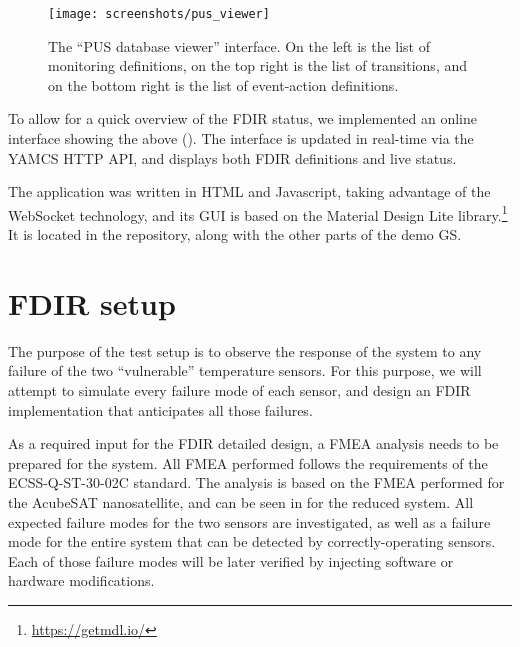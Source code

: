 \documentclass[a4paper,nobib]{tufte-book}
\begin{document}
\begin{figure}[h]
	\texttt{[image: screenshots/pus\_viewer]}
	\caption[The ``PUS database viewer'' interface]{The ``\acs{PUS} database viewer'' interface. On the left is the list of monitoring definitions, on the top right is the list of transitions, and on the bottom right is the list of event-action definitions.}
		\label{fig:pusviewer}
\end{figure}
	
To allow for a quick overview of the \acs{FDIR} status, we implemented an online interface showing the above (). The interface is updated in real-time via the \acs{YAMCS} \acs{HTTP} \acs{API}, and displays both \acs{FDIR} definitions and live status.

The application was written in HTML and Javascript, taking advantage of the WebSocket technology, and its GUI is based on the Material Design Lite library.\footnote[]{\url{https://getmdl.io/}} It is located in the repository, along with the other parts of the demo \acl{GS}.

\section{\ac{FDIR} setup}

The purpose of the test setup is to observe the response of the system to any failure of the two ``vulnerable'' temperature sensors. For this purpose, we will attempt to simulate every failure mode of each sensor, and design an \ac{FDIR} implementation that anticipates all those failures.

As a required input for the \ac{FDIR} detailed design, a \ac{FMEA} analysis needs to be prepared for the system. All \ac{FMEA} performed follows the requirements of the ECSS-Q-ST-30-02C standard.\autocite{ECSS-Q-ST-30-02C} The analysis is based on the \ac{FMEA} performed for the AcubeSAT nanosatellite,\autocite{retselis_acubesat_fmea_2020} and can be seen in  for the reduced system. All expected failure modes for the two sensors are investigated, as well as a failure mode for the entire system that can be detected by correctly-operating sensors. Each of those failure modes will be later verified by injecting software or hardware modifications.
\end{document}
